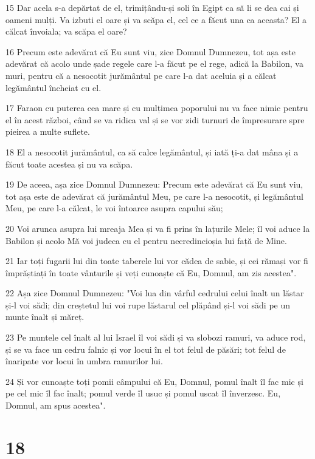 \par 15 Dar acela s-a depărtat de el, trimițându-și soli în Egipt ca să li se dea cai și oameni mulți. Va izbuti el oare și va scăpa el, cel ce a făcut una ca aceasta? El a călcat învoiala; va scăpa el oare?
\par 16 Precum este adevărat că Eu sunt viu, zice Domnul Dumnezeu, tot așa este adevărat că acolo unde șade regele care l-a făcut pe el rege, adică la Babilon, va muri, pentru că a nesocotit jurământul pe care l-a dat aceluia și a călcat legământul încheiat cu el.
\par 17 Faraon cu puterea cea mare și cu mulțimea poporului nu va face nimic pentru el în acest război, când se va ridica val și se vor zidi turnuri de împresurare spre pieirea a multe suflete.
\par 18 El a nesocotit jurământul, ca să calce legământul, și iată ți-a dat mâna și a făcut toate acestea și nu va scăpa.
\par 19 De aceea, așa zice Domnul Dumnezeu: Precum este adevărat că Eu sunt viu, tot așa este de adevărat că jurământul Meu, pe care l-a nesocotit, și legământul Meu, pe care l-a călcat, le voi întoarce asupra capului său;
\par 20 Voi arunca asupra lui mreaja Mea și va fi prins în lațurile Mele; îl voi aduce la Babilon și acolo Mă voi judeca cu el pentru necredincioșia lui față de Mine.
\par 21 Iar toți fugarii lui din toate taberele lui vor cădea de sabie, și cei rămași vor fi împrăștiați în toate vânturile și veți cunoaște că Eu, Domnul, am zis acestea".
\par 22 Așa zice Domnul Dumnezeu: "Voi lua din vârful cedrului celui înalt un lăstar și-l voi sădi; din creștetul lui voi rupe lăstarul cel plăpând și-l voi sădi pe un munte înalt și măreț.
\par 23 Pe muntele cel înalt al lui Israel îl voi sădi și va slobozi ramuri, va aduce rod, și se va face un cedru falnic și vor locui în el tot felul de păsări; tot felul de înaripate vor locui în umbra ramurilor lui.
\par 24 Și vor cunoaște toți pomii câmpului că Eu, Domnul, pomul înalt îl fac mic și pe cel mic îl fac înalt; pomul verde îl usuc și pomul uscat îl înverzesc. Eu, Domnul, am spus acestea".

\chapter{18}

